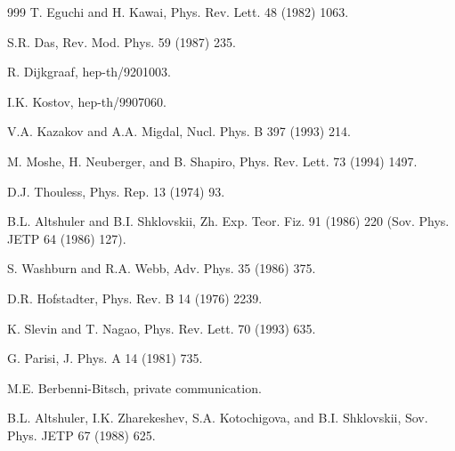 \begin{thebibliography}{999}
          T. Eguchi and H. Kawai, 
                      Phys. Rev. Lett. 48 (1982) 1063.            %

         S.R. Das, 
                      Rev. Mod. Phys. 59 (1987) 235.              %

   R. Dijkgraaf,
                      hep-th/9201003.                             %

      I.K. Kostov,
                      hep-th/9907060.                             %

     V.A. Kazakov and A.A. Migdal,
                      Nucl. Phys. B 397 (1993) 214.               %

       M. Moshe, H. Neuberger, and B. Shapiro,
                      Phys. Rev. Lett. 73 (1994) 1497.            %

      D.J. Thouless, 
                      Phys. Rep. 13 (1974) 93.                    %

   B.L. Altshuler and B.I. Shklovskii,
                      Zh. Exp. Teor. Fiz. 91 (1986) 220
                      (Sov. Phys. JETP 64 (1986) 127).

      S. Washburn and R.A. Webb, 
                      Adv. Phys. 35 (1986) 375.                   %

     D.R. Hofstadter,
                      Phys. Rev. B 14 (1976) 2239.                %

      K. Slevin and T. Nagao,
                      Phys. Rev. Lett. 70 (1993) 635.              %

      G. Parisi, 
                      J. Phys. A 14 (1981) 735.                   %

      M.E. Berbenni-Bitsch, 
                      private communication.

   B.L. Altshuler, I.K. Zharekeshev,
                      S.A. Kotochigova, and B.I. Shklovskii, 
                      Sov. Phys. JETP 67 (1988) 625.              %


\end{thebibliography}
